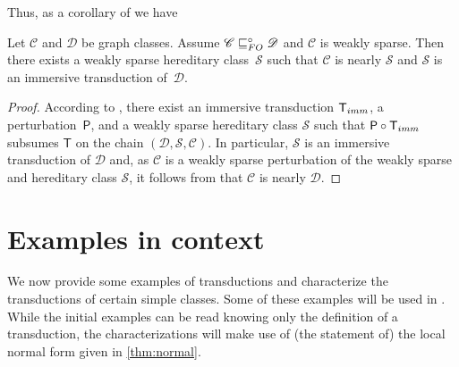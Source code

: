 \documentclass{lmcs}
\newcommand{\Cc}{\mathscr{C}}
\newcommand{\Dd}{\mathscr{D}}
\newcommand{\Ss}{\mathscr{S}}
\renewcommand{\FO}{{\rm FO}}
\theoremstyle{definition}
\begin{document}
Thus, as a corollary of  we have
\begin{cor}
	\label{cor:rel-normal}
	Let $\Cc$ and $\Dd$ be graph classes. Assume $\Cc\sqsubseteq_\FO^\circ\Dd$ and  $\Cc$ is weakly sparse.
	Then there exists a weakly sparse hereditary  class~$\Ss$ such that 
	$\Cc$ is nearly $\Ss$ and $\Ss$ is an immersive transduction of~$\Dd$.
\end{cor}
\begin{proof}
	According to , 
	 there exist an immersive transduction $\mathsf T_{\rm imm}$, a perturbation~$\mathsf P$, and a weakly sparse hereditary  class $\Ss$ such that 
	$\mathsf P\circ\mathsf T_{\rm imm}$ subsumes $\mathsf T$ on the chain $(\Dd,\Ss,\Cc)$.
	In particular, $\Ss$ is an immersive transduction of $\Dd$ and, as	$\Cc$ is a weakly sparse perturbation of the weakly sparse and hereditary class $\Ss$, it follows from  that  $\Cc$ is nearly $\Dd$.
\end{proof}

\part{Examples in context}
\label{part:examples}
We now provide some examples of transductions and characterize the transductions of certain simple classes. Some of these examples will be used in . While the initial examples can be read knowing only the definition of a transduction, the characterizations will make use of (the statement of) the local normal form given in \cref{thm:normal}.
\end{document}
